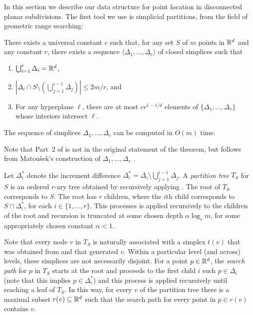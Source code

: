 \documentclass{patmorin}
\begin{document}
In this section we describe our data structure for point location in
disconnected planar subdivisions.  The first tool we use is simplicial
partitions, from the field of geometric range searching:

\begin{thm}[Matou\v{s}ek 1992]
There exists a universal constant $c$ such that, for any set $S$ of $m$
points in $\mathbb{R}^d$ and any constant $r$, there exists a sequence
$\langle \Delta_1,\ldots,\Delta_r\rangle$ of closed simplices such that
  \begin{enumerate}
    \item $\bigcup_{i=1}^r \Delta_i = \mathbb{R}^d$,
    \item $\left|\Delta_i \cap S\setminus
    \left(\bigcup_{j=1}^{i-1}\Delta_j\right)\right| \le 2m/r$, and
    \item For any hyperplane $\ell$, there are at most $cr^{1-1/d}$ elements of
  $\{\Delta_1,\ldots,\Delta_r\}$ whose interiors intersect $\ell$.
  \end{enumerate}
  The sequence of simplices $\Delta_1,\ldots,\Delta_r$ can be computed
  in $O(m)$ time.
\end{thm}

Note that Part~2 of  is not in the original
statement of the theorem, but follows from Matou\v{s}ek's construction
of $\Delta_1,\ldots,\Delta_r$ \cite{m92}.

Let $\Delta_i^*$ denote the increment difference
$\Delta_i^*=\Delta_i\setminus\bigcup_{j=1}^{i-1}\Delta_j$.
A \emph{partition tree} $T_S$ for $S$ is an ordered $r$-ary tree obtained
by recursively applying .  The root of $T_S$
corresponds to $S$.  The root has $r$ children, where the $i$th child
corresponds to $S\cap \Delta_i^*$, for each $i\in\{1,\ldots,r\}$.
This processes is applied recursively to the children of the root and
recursion is truncated at some chosen depth $\alpha\log_r m$, for some
appropriately chosen constant $\alpha < 1$.

Note that every node $v$ in $T_S$ is naturally associated with a simplex
$t(v)$ that was obtained from  and that generated
$v$. Within a particular level (and across) levels, these simplices are
not necessarily disjoint.  For a point $p\in\mathbb{R}^d$, the \emph{search
path} for $p$ in $T_S$ starts at the root and proceeds to the first
child $i$ such $p\in\Delta_i$ (note that this implies $p\in\Delta_i^*$)
and this process is applied recursively until reaching  a leaf of $T_S$.
In this way, for every $v$ of the partition tree there is a maximal
subset $r(v)\subseteq \mathbb{R}^d$ such that the search path for every point
in $p\in r(v)$ contains $v$.
\end{document}
